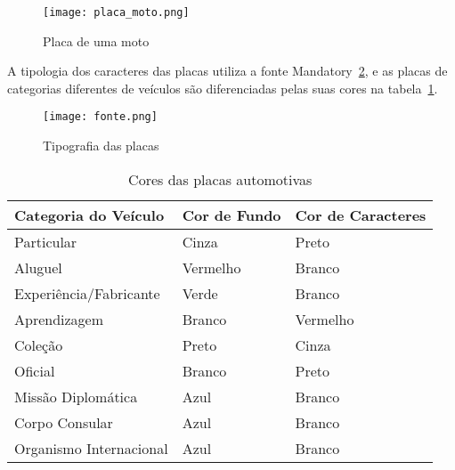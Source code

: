 \begin{figure}[H]
	\centering
	\texttt{[image: placa\_moto.png]}
	\caption{Placa de uma moto}
	\label{fig:placa_moto}
\end{figure}

A tipologia dos caracteres das placas utiliza a fonte
Mandatory~\ref{fig:tipografia}, e as placas de categorias diferentes de veículos
são diferenciadas pelas suas cores na tabela~\ref{tab:placa_cores}.

\begin{figure}[H]
	\centering
	\texttt{[image: fonte.png]}
	\caption{Tipografia das placas}
	\label{fig:tipografia}
\end{figure}

\begin{table}[]
\centering
\label{tab:placa_cores}
\caption{Cores das placas automotivas}
\begin{tabular}{|l|l|l|}
\hline
\textbf{Categoria do Veículo}                                               & \textbf{Cor de Fundo} & \textbf{Cor de Caracteres} \\ \hline
Particular                                                                  & Cinza                 & Preto                      \\ \hline
Aluguel                                                                     & Vermelho              & Branco                     \\ \hline
Experiência/Fabricante                                                      & Verde                 & Branco                     \\ \hline
Aprendizagem                                                                & Branco                & Vermelho                   \\ \hline
Coleção                                                                     & Preto                 & Cinza                      \\ \hline
Oficial                                                                     & Branco                & Preto                      \\ \hline
Missão Diplomática                                                          & Azul                  & Branco                     \\ \hline
Corpo Consular                                                              & Azul                  & Branco                     \\ \hline
Organismo Internacional                                                     & Azul                  & Branco                     \\ \hline

\end{tabular}
\end{table}
